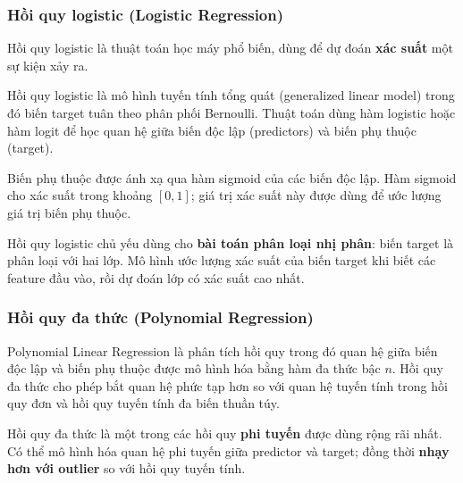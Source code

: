 \subsubsection{Hồi quy logistic (Logistic Regression)}

\begin{dinhnghia}[title={Hồi quy logistic}]
Hồi quy logistic là thuật toán học máy phổ biến, dùng để dự đoán \textbf{xác suất} một sự kiện xảy ra.
\end{dinhnghia}

\begin{phuongphap}[title={Mô hình và hàm sigmoid}]
Hồi quy logistic là mô hình tuyến tính tổng quát (generalized linear model) trong đó biến target tuân theo phân phối Bernoulli.
Thuật toán dùng hàm logistic hoặc hàm logit để học quan hệ giữa biến độc lập (predictors) và biến phụ thuộc (target).

Biến phụ thuộc được ánh xạ qua hàm sigmoid của các biến độc lập.
Hàm sigmoid cho xác suất trong khoảng $[0, 1]$; giá trị xác suất này được dùng để ước lượng giá trị biến phụ thuộc.
\end{phuongphap}

\begin{ynghia}[title={Ứng dụng chính}]
Hồi quy logistic chủ yếu dùng cho \textbf{bài toán phân loại nhị phân}: biến target là phân loại với hai lớp.
Mô hình ước lượng xác suất của biến target khi biết các feature đầu vào, rồi dự đoán lớp có xác suất cao nhất.
\end{ynghia}

\subsubsection{Hồi quy đa thức (Polynomial Regression)}

\begin{dinhnghia}[title={Hồi quy đa thức}]
Polynomial Linear Regression là phân tích hồi quy trong đó quan hệ giữa biến độc lập và biến phụ thuộc được mô hình hóa bằng hàm đa thức bậc $n$.
Hồi quy đa thức cho phép bắt quan hệ phức tạp hơn so với quan hệ tuyến tính trong hồi quy đơn và hồi quy tuyến tính đa biến thuần túy.
\end{dinhnghia}

\begin{tinhchat}[title={feature}]
Hồi quy đa thức là một trong các hồi quy \textbf{phi tuyến} được dùng rộng rãi nhất.
Có thể mô hình hóa quan hệ phi tuyến giữa predictor và target; đồng thời \textbf{nhạy hơn với outlier} so với hồi quy tuyến tính.
\end{tinhchat}


